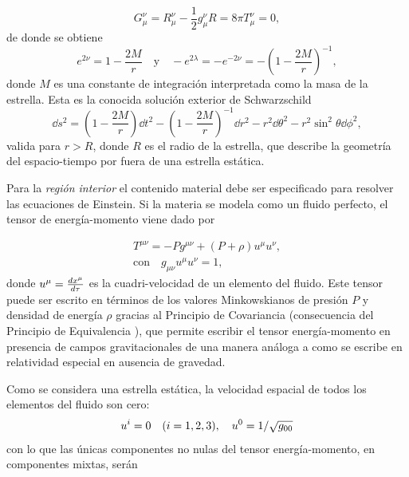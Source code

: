 \begin{equation}
    G _ { \mu } ^ { \nu } = R _ { \mu } ^ { \nu } - \frac { 1 } { 2 } g _ { \mu } ^ { \nu } R = 8 \pi T _ { \mu } ^ { \nu }=0,
\end{equation}
de donde se obtiene
\begin{equation}
    e ^ { 2 \nu } = 1 - \frac { 2 M } { r }\quad \text{y}\quad - e ^ { 2 \lambda } = - e ^ { - 2 \nu } = - \left( 1 - \frac { 2 M } { r } \right) ^ { - 1 },
\end{equation}
donde $M$ es una constante de integración interpretada como la masa de la estrella. Esta es la conocida solución exterior de Schwarzschild
\begin{equation}
    \dd{s} ^ { 2 } =  \left( 1 - \frac { 2 M } { r } \right) \dd{t} ^ { 2 } - \left( 1 - \frac { 2 M } { r } \right) ^ { - 1 } \dd{r} ^ { 2 }  - r ^ { 2 } \dd{\theta} ^ { 2 } - r ^ { 2 } \sin ^ { 2 } \theta \dd{\phi} ^ { 2 }, \label{schwarzs}
\end{equation}
valida para $r>R$, donde $R$ es el radio de la estrella, que describe la geometría del espacio-tiempo por fuera de una estrella estática.

Para la \textit{región interior} el contenido material debe ser especificado para resolver las ecuaciones de Einstein. Si la materia se modela como un fluido perfecto, el tensor de energía-momento viene dado por

\begin{equation}
    \begin{array} { c } { T ^ { \mu \nu } = - P g ^ { \mu \nu } + ( P + \rho ) u ^ { \mu } u ^ { \nu } }, \\ \text{con} \quad { g _ { \mu \nu } u ^ { \mu } u ^ { \nu } = 1 }, \end{array}
\end{equation}
donde $u^{\mu}=\dv{x^{\mu}}{\tau}$ es la cuadri-velocidad de un elemento del fluido. Este tensor puede ser escrito en términos de los valores Minkowskianos de presión $P$ y densidad de energía $\rho$ gracias al Principio de Covariancia (consecuencia del Principio de Equivalencia \cite{Weinberg1972}), que permite escribir el tensor energía-momento en presencia de campos gravitacionales de una manera análoga a como se escribe en relatividad especial en ausencia de gravedad.

Como se considera una estrella estática, la velocidad espacial de todos los elementos del fluido son cero:
\begin{equation}
    u^{i}=0 \quad (i=1,2,3)\qc u ^ { 0 } = 1 / \sqrt { g _ { 00 } }
\end{equation}
con lo que las únicas componentes no nulas del tensor energía-momento, en componentes mixtas, serán

